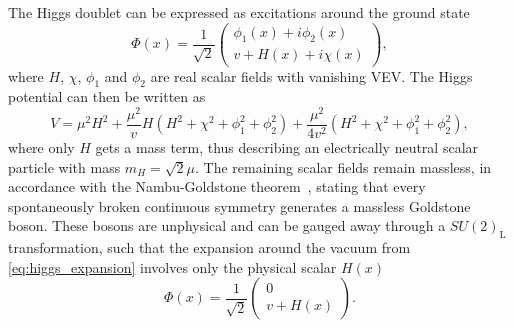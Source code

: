 The Higgs doublet can be expressed as excitations around the ground state
\begin{equation}
	\Phi(x) = \frac{1}{\sqrt{2}} \begin{pmatrix}
		\phi_1(x)+i\phi_2(x) \\
		v + H(x) + i\chi(x)
	\end{pmatrix},
	\label{eq:higgs_expansion}
\end{equation}
where $H$, $\chi$, $\phi_1$ and $\phi_2$ are real scalar fields with vanishing VEV. The Higgs potential can then be written as
\begin{equation}
	V = \mu^2H^2 + \frac{\mu^2}{v} H (H^2 + \chi^2 + \phi_1^2+\phi_2^2)+ \frac{\mu^2}{4v^2}(H^2 + \chi^2 + \phi_1^2 + \phi_2^2),
\end{equation}
where only $H$ gets a mass term, thus describing an electrically neutral scalar particle with mass $m_H = \sqrt{2}\mu$. The remaining scalar fields remain massless, in accordance with the Nambu-Goldstone theorem~\cite{Nambu:1960tm,Goldstone:1961eq}, stating that every spontaneously broken continuous symmetry generates a massless Goldstone boson. These bosons are unphysical and can be gauged away through a $SU(2)_\mathrm{L}$ transformation, such that the expansion around the vacuum from \cref{eq:higgs_expansion} involves only the physical scalar $H(x)$
\begin{equation}
	\Phi(x) = \frac{1}{\sqrt{2}} \begin{pmatrix}
		0 \\
		v + H(x)
	\end{pmatrix}.	
\end{equation}
